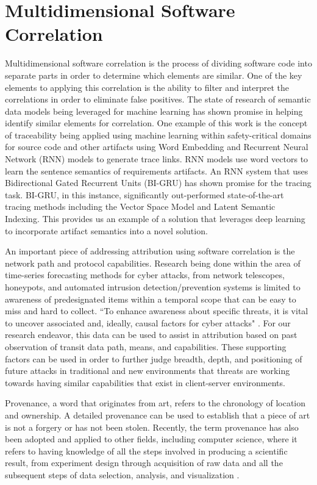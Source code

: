 \documentclass[12pt]{report}
\begin{document}
\section{Multidimensional Software Correlation}
Multidimensional software correlation is the process of dividing software code into separate parts in order to determine which elements are similar.  One of the key elements to applying this correlation is the ability to filter and interpret the correlations in order to eliminate false positives.  The state of research of semantic data models being leveraged for machine learning has shown promise in helping identify similar elements for correlation.  One example of this work is the concept of traceability being applied using machine learning within safety-critical domains for source code and other artifacts using Word Embedding and Recurrent Neural Network (RNN) models to generate trace links.  RNN models use word vectors to learn the sentence semantics of requirements artifacts.  An RNN system that uses Bidirectional Gated Recurrent Units (BI-GRU) has shown promise for the tracing task.  BI-GRU, in this instance, significantly out-performed state-of-the-art tracing methods including the Vector Space Model and Latent Semantic Indexing.   This provides us an example of a solution that leverages deep learning to incorporate artifact semantics into a novel solution. \cite{guo2017semantically}

An important piece of addressing attribution using software correlation is the network path and protocol capabilities.  Research being done within the area of time-series forecasting methods for cyber attacks, from network telescopes, honeypots, and automated intrusion detection/prevention systems is limited to awareness of predesignated items within a temporal scope that can be easy to miss and hard to collect.  ``To enhance awareness about specific threats, it is vital to uncover associated and, ideally, causal factors for cyber attacks"  \cite{DBLP:journals/corr/BakdashHZMTSHD17}.  For our research endeavor, this data can be used to assist in attribution based on past observation of transit data path, means, and capabilities.  These supporting factors can be used in order to further judge breadth, depth, and positioning of future attacks in traditional and new environments that threats are working towards having similar capabilities that exist in client-server environments.

Provenance, a word that originates from art, refers to the chronology of location and ownership.  A detailed provenance can be used to establish that a piece of art is not a forgery or has not been stolen.  Recently, the term provenance has also been adopted and applied to other fields, including computer science, where it refers to having knowledge of all the steps involved in producing a scientific result, from experiment design through acquisition of raw data and all the subsequent steps of data selection, analysis, and visualization \cite{provenance:2011}.
\end{document}
